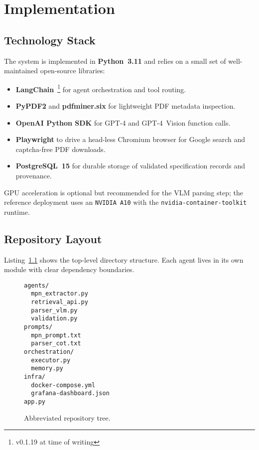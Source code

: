 \chapter{Implementation}
\label{chapter:implementation}

\section{Technology Stack}
The system is implemented in \textbf{Python~3.11} and relies on a small set of well-maintained open-source libraries:
\begin{itemize}
  \item \textbf{LangChain}~\footnote{v0.1.19 at time of writing} for agent orchestration and tool routing.
  \item \textbf{PyPDF2} and \textbf{pdfminer.six} for lightweight PDF metadata inspection.
  \item \textbf{OpenAI Python SDK} for GPT-4 and GPT-4~Vision function calls.
  \item \textbf{Playwright} to drive a head-less Chromium browser for Google search and captcha-free PDF downloads.
  \item \textbf{PostgreSQL~15} for durable storage of validated specification records and provenance.
\end{itemize}
GPU acceleration is optional but recommended for the VLM parsing step; the reference deployment uses an \texttt{NVIDIA~A10} with the \texttt{nvidia-container-toolkit} runtime.

\section{Repository Layout}
Listing~\ref{lst:tree} shows the top-level directory structure.  Each agent lives in its own module with clear dependency boundaries.
\begin{figure}[H]
\centering
\begin{minipage}{0.9\textwidth}
\begin{verbatim}
agents/
  mpn_extractor.py
  retrieval_api.py
  parser_vlm.py
  validation.py
prompts/
  mpn_prompt.txt
  parser_cot.txt
orchestration/
  executor.py
  memory.py
infra/
  docker-compose.yml
  grafana-dashboard.json
app.py
\end{verbatim}
\end{minipage}
\caption{Abbreviated repository tree.}
\label{lst:tree}
\end{figure}


